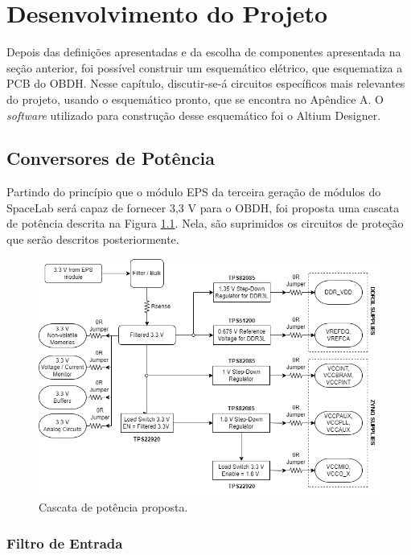 \chapter{Desenvolvimento do Projeto}

Depois das definições apresentadas e da escolha de componentes apresentada na seção anterior, foi possível construir um esquemático elétrico, que esquematiza a PCB do OBDH. Nesse capítulo, discutir-se-á circuitos específicos mais relevantes do projeto, usando o esquemático pronto, que se encontra no Apêndice A. O \textit{software} utilizado para construção desse esquemático foi o Altium Designer.

\section{Conversores de Potência}

Partindo do princípio que o módulo EPS da terceira geração de módulos do SpaceLab será capaz de fornecer 3,3 V para o OBDH, foi proposta uma cascata de potência descrita na Figura \ref{fig:power}. Nela, são suprimidos os circuitos de proteção que serão descritos posteriormente.

\begin{figure}[H]
    \centering
    \includegraphics[scale=0.6]{images/Power_system.png}
    \caption{Cascata de potência proposta.}
    \label{fig:power}
\end{figure}

\subsection{Filtro de Entrada}

